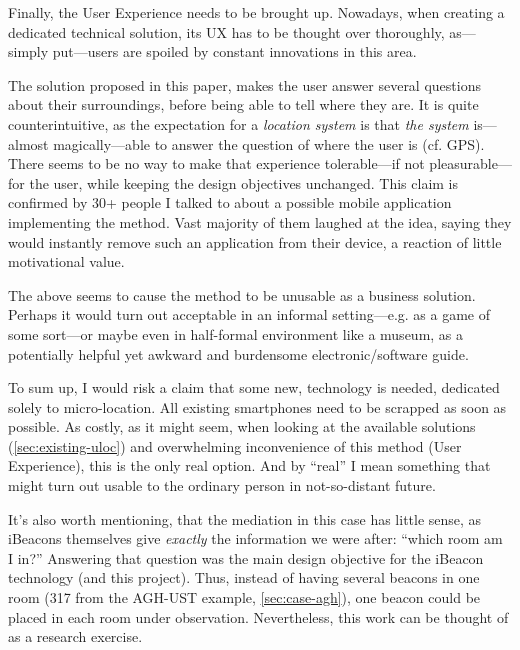 Finally, the User Experience needs to be brought up. Nowadays, when creating a dedicated technical solution, its UX has to be thought over thoroughly, as---simply put---users are spoiled by constant innovations in this area.

The solution proposed in this paper, makes the user answer several questions about their surroundings, before being able to tell where they are. It is quite counterintuitive, as the expectation for a \emph{location system} is that \emph{the system} is---almost magically---able to answer the question of where the user is (cf. GPS). There seems to be no way to make that experience tolerable---if not pleasurable---for the user, while keeping the design objectives unchanged. This claim is confirmed by 30+ people I talked to about a possible mobile application implementing the method. Vast majority of them laughed at the idea, saying they would instantly remove such an application from their device, a reaction of little motivational value.

The above seems to cause the method to be unusable as a business solution. Perhaps it would turn out acceptable in an informal setting---e.g. as a game of some sort---or maybe even in half-formal environment like a museum, as a potentially helpful yet awkward and burdensome electronic/software guide.

To sum up, I would risk a claim that some new, technology is needed, dedicated solely to micro-location. All existing smartphones need to be scrapped as soon as possible. As costly, as it might seem, when looking at the available solutions (\cref{sec:existing-uloc}) and overwhelming inconvenience of this method (User Experience), this is the only real option. And by ``real'' I mean something that might turn out usable to the ordinary person in not-so-distant future.

It's also worth mentioning, that the mediation in this case has little sense, as iBeacons themselves give \emph{exactly} the information we were after: ``which room am I in?'' Answering that question was the main design objective for the iBeacon technology (and this project). Thus, instead of having several beacons in one room (317 from the AGH-UST example, \cref{sec:case-agh}), one beacon could be placed in each room under observation. Nevertheless, this work can be thought of as a research exercise.

